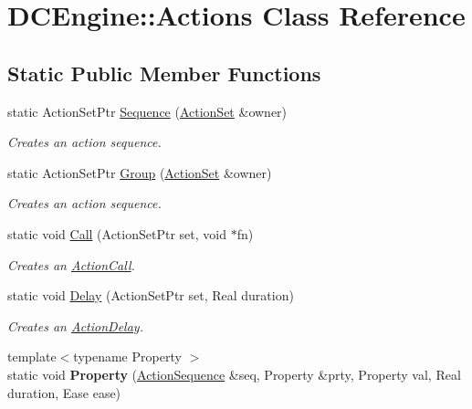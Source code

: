 \hypertarget{classDCEngine_1_1Actions}{\section{D\-C\-Engine\-:\-:Actions Class Reference}
\label{classDCEngine_1_1Actions}
}
\subsection*{Static Public Member Functions}
\begin{DoxyCompactItemize}
\item 
static Action\-Set\-Ptr \hyperlink{classDCEngine_1_1Actions_a9c1cfb84ef8a34a9e40824c21d09bf11}{Sequence} (\hyperlink{classDCEngine_1_1ActionSet}{Action\-Set} \&owner)
\begin{DoxyCompactList}\small\item\em Creates an action sequence. \end{DoxyCompactList}\item 
static Action\-Set\-Ptr \hyperlink{classDCEngine_1_1Actions_a45126cc19656693474c2c3ed90bd4ed1}{Group} (\hyperlink{classDCEngine_1_1ActionSet}{Action\-Set} \&owner)
\begin{DoxyCompactList}\small\item\em Creates an action sequence. \end{DoxyCompactList}\item 
static void \hyperlink{classDCEngine_1_1Actions_a8c098c5645c80d97234ae97299b3d426}{Call} (Action\-Set\-Ptr set, void $\ast$fn)
\begin{DoxyCompactList}\small\item\em Creates an \hyperlink{classDCEngine_1_1ActionCall}{Action\-Call}. \end{DoxyCompactList}\item 
static void \hyperlink{classDCEngine_1_1Actions_a6c4528212320eba1bc7e13417ce458b2}{Delay} (Action\-Set\-Ptr set, Real duration)
\begin{DoxyCompactList}\small\item\em Creates an \hyperlink{classDCEngine_1_1ActionDelay}{Action\-Delay}. \end{DoxyCompactList}\item 
\hypertarget{classDCEngine_1_1Actions_aa94bbf255d175be5c62d44424daf7d47}{{\footnotesize template$<$typename Property $>$ }\\static void {\bfseries Property} (\hyperlink{classDCEngine_1_1ActionSequence}{Action\-Sequence} \&seq, Property \&prty, Property val, Real duration, Ease ease)}\label{classDCEngine_1_1Actions_aa94bbf255d175be5c62d44424daf7d47}

\end{DoxyCompactItemize}


